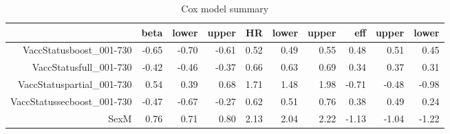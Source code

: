 \begin{table}[ht]
\centering
\begin{tabular}{rrrrrrrrrr}
  \hline
 & beta & lower & upper & HR & lower & upper & eff & upper & lower \\ 
  \hline
VaccStatusboost\_001-730 & -0.65 & -0.70 & -0.61 & 0.52 & 0.49 & 0.55 & 0.48 & 0.51 & 0.45 \\ 
  VaccStatusfull\_001-730 & -0.42 & -0.46 & -0.37 & 0.66 & 0.63 & 0.69 & 0.34 & 0.37 & 0.31 \\ 
  VaccStatuspartial\_001-730 & 0.54 & 0.39 & 0.68 & 1.71 & 1.48 & 1.98 & -0.71 & -0.48 & -0.98 \\ 
  VaccStatussecboost\_001-730 & -0.47 & -0.67 & -0.27 & 0.62 & 0.51 & 0.76 & 0.38 & 0.49 & 0.24 \\ 
  SexM & 0.76 & 0.71 & 0.80 & 2.13 & 2.04 & 2.22 & -1.13 & -1.04 & -1.22 \\ 
   \hline
\end{tabular}
\caption{Cox model summary} 
\end{table}
